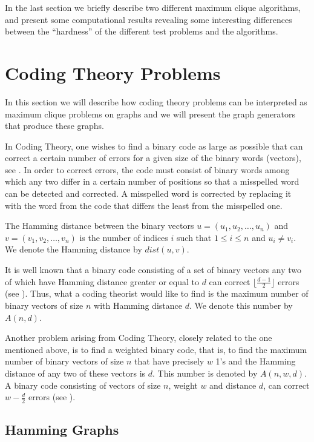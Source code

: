 In the last section we briefly describe two different maximum clique
algorithms, and present some computational results revealing
some interesting differences between the ``hardness'' of the different test
problems and the algorithms.

\section{Coding Theory Problems}

In this section we will describe how coding theory
problems can be interpreted as maximum clique problems on graphs and
we will present the graph generators that produce these graphs.

In Coding Theory, one wishes to find a binary code as
large as possible that can correct a certain number of errors for a
given size of the binary words (vectors), see \cite{Bro,Slo}. In order to
correct errors, the code must consist of binary words among which any two
differ in a certain number of positions so that a misspelled word can be
detected and corrected. A misspelled word is corrected by replacing it with the
word from the code that differs the least from the misspelled one.

The Hamming distance between the binary vectors
$u=(u_1,u_2,\ldots,u_n)$ and $v=(v_1,v_2,\ldots,v_n)$ is the number of
indices $i$ such that $1\leq i \leq n$ and $u_i\neq v_i$. We denote the
Hamming distance by $dist(u,v)$.

It is well known that a binary code consisting of a set of binary
vectors any two of which have Hamming distance greater or equal to $d$
can correct $\lfloor \frac{d-1}{2} \rfloor$ errors (see \cite{WS}). Thus, what
a coding theorist would like to find is the maximum number of binary
vectors of size $n$ with Hamming distance $d$. We denote this number by
$A(n,d)$.

Another problem arising from Coding Theory, closely related to the one
mentioned above, is to find a weighted binary code, that is, to find
the maximum number of binary vectors of size $n$ that have precisely
$w$ 1's and the Hamming distance of any two of these vectors is $d$. This
number is denoted by $A(n,w,d)$.
A binary code consisting of vectors of size $n$, weight $w$ and
distance $d$, can correct $w-\frac{d}{2}$ errors (see \cite{WS}).

\subsection{Hamming Graphs}

